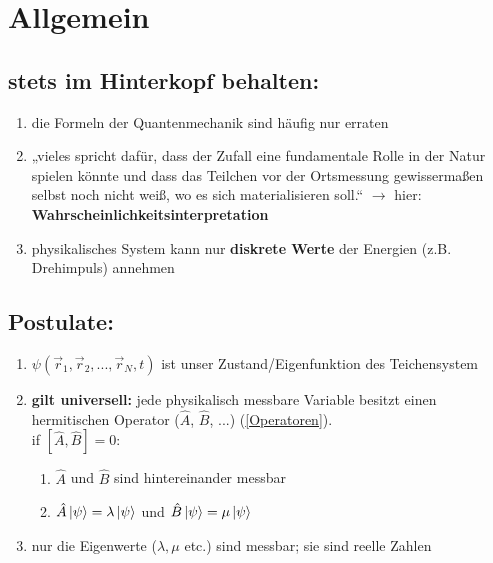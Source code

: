 \pagestyle{headings}

\section{Allgemein}

\subsection{stets im Hinterkopf behalten:}
\begin{enumerate}
\item die Formeln der Quantenmechanik sind häufig nur erraten
\item „vieles spricht dafür, dass der Zufall eine fundamentale Rolle in der Natur spielen könnte und dass 
das Teilchen vor der Ortsmessung gewissermaßen selbst noch nicht weiß, wo es sich materialisieren soll.“ $\rightarrow$ hier: \textbf{Wahrscheinlichkeitsinterpretation}
\item physikalisches System kann nur \textbf{diskrete Werte} der Energien (z.B. Drehimpuls) annehmen
\end{enumerate}

\subsection{Postulate:}
\begin{enumerate}
\item $\psi(\vec{r}_1,\vec{r}_2, ...,\vec{r}_N,t)$ ist unser Zustand/Eigenfunktion des Teichensystem
\item \textbf{gilt universell:} jede physikalisch messbare Variable besitzt einen hermitischen Operator ($\hat{A}$, $\hat{B}$, ...) (\ref{Operatoren}).\\
 if $[\hat{A},\hat{B}]=0$:
\begin{enumerate}
    \item $\hat{A}$ und $\hat{B}$ sind hintereinander messbar
    \item $\hat{A}\ket{\psi}=\lambda\ket{\psi}$ und $\hat{B}\ket{\psi}=\mu\ket{\psi}$
\end{enumerate}
\item nur die Eigenwerte ($\lambda,\mu$ etc.) sind messbar; sie sind reelle Zahlen 

\end{enumerate}




